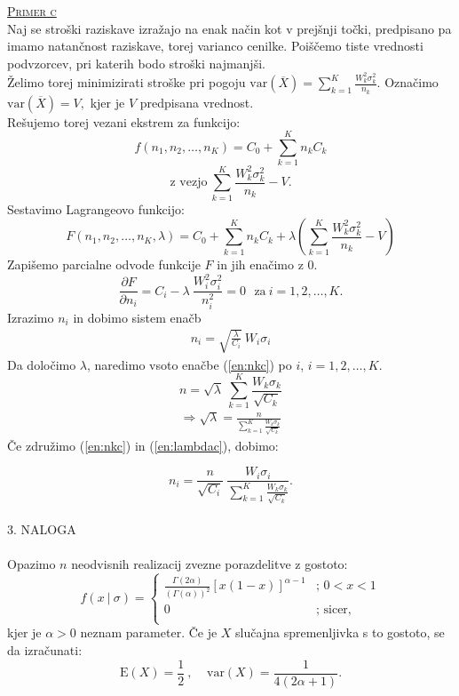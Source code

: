 \documentclass[a4paper,12pt]{article}
\begin{document}
\noindent
\textsc{\underline{Primer c}}
\\
Naj se stroški raziskave izražajo na enak način kot v prejšnji točki, predpisano pa imamo natančnost raziskave, torej varianco cenilke. Poiščemo tiste vrednosti podvzorcev, pri katerih bodo stroški najmanjši.
\\
Želimo torej minimizirati stroške pri pogoju $ \text{var}(\overline{X}) = \sum_{k = 1}^{K} \frac{W_k^2 \sigma_k^2}{n_k}.$ Označimo $\text{var}(\overline{X}) = V,$ kjer je $V$ predpisana vrednost.
\\
Rešujemo torej vezani ekstrem za funkcijo:
$$ f (n_1, n_2, \ldots, n_K) = C_0 + \sum_{k = 1}^{K} n_k C_k $$
$$ \text{z vezjo} \ \sum_{k = 1}^{K} \frac{W_k^2 \sigma_k^2}{n_k} - V. $$
Sestavimo Lagrangeovo funkcijo:
$$ F (n_1, n_2, \ldots, n_K, \lambda) = C_0 + \sum_{k = 1}^{K} n_k C_k  + \lambda \left( \sum_{k = 1}^{K} \frac{W_k^2 \sigma_k^2}{n_k} - V \right)$$
Zapišemo parcialne odvode funkcije $F$ in jih enačimo z $0$.
$$ \frac{ \partial F}{\partial n_i} = C_i - \lambda \ \frac{W_i^2 \sigma_i^2}{n_i^2} = 0 \ \ \ \text{za} \ i = 1, 2, \ldots, K.  $$
Izrazimo $n_i$ in dobimo sistem enačb
\begin{align}\label{en:nkc}
n_i = \sqrt{\frac{\lambda}{C_i}} \ W_i \sigma_i
\end{align}
Da določimo $\lambda$, naredimo vsoto enačbe (\ref{en:nkc}) po $i$, $i = 1, 2, \ldots, K.$
$$ n = \sqrt{\lambda} \ \sum_{k = 1}^{K} \frac{W_k \sigma_k}{\sqrt{C_k}} $$
\begin{align}\label{en:lambdac}
\Rightarrow \sqrt{\lambda} = \frac{n}{\sum_{k = 1}^{K} \frac{W_k \sigma_k}{\sqrt{C_k}}}
\end{align}
Če združimo (\ref{en:nkc}) in (\ref{en:lambdac}), dobimo:

$$ n_i = \frac{n}{\sqrt{C_i}} \ \frac{W_i \sigma_i}{\sum_{k = 1}^{K} \frac{W_k \sigma_k}{\sqrt{C_k}}}. $$
\\


\noindent
\textsc{\large{3. NALOGA}}
\\
\\
Opazimo $n$ neodvisnih realizacij zvezne porazdelitve z gostoto:
\begin{displaymath}
    f(x \ | \ \sigma) = \left\{ \begin{array}{ll}
     \frac{\Gamma(2 \alpha)}{(\Gamma (\alpha))^2} \left[ x(1 - x) \right]^{\alpha - 1} & \textrm{; \ $0 < x < 1$}\\
     0 & \textrm{; \ sicer,} \\
    \end{array} \right. 
\end{displaymath}
kjer je $\alpha > 0$ neznam parameter. Če je $X$ slučajna spremenljivka s to gostoto, se da izračunati:
$$ \text{E}(X) = \frac{1}{2} \ , \ \ \ \ \ \text{var}(X) = \frac{1}{4(2 \alpha + 1)}. $$
\\
\end{document}
